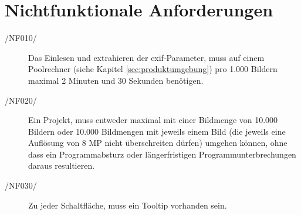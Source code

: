 \section{Nichtfunktionale Anforderungen}

\label{sec:nichtfunktionale_anforderungen}

\begin{description}
	
	\item[/NF010/] Das Einlesen und extrahieren der \gls{exif}-Parameter, muss auf einem Poolrechner (siehe Kapitel \ref{sec:produktumgebung}) pro 1.000 Bildern maximal 2 Minuten und 30 Sekunden benötigen.
	
	\item[/NF020/] Ein Projekt, muss entweder maximal mit einer Bildmenge von 10.000 Bildern oder 10.000 Bildmengen mit jeweils einem Bild (die jeweils eine Auflösung von 8 MP nicht überschreiten dürfen) umgehen können, ohne dass ein Programmabsturz oder längerfristigen Programmunterbrechungen daraus resultieren.

	\item[/NF030/] Zu jeder Schaltfläche, muss ein Tooltip vorhanden sein.
	
\end{description}